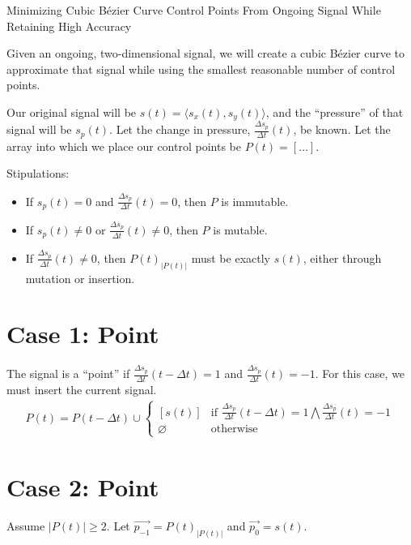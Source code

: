 \documentclass[12pt]{article}
\begin{document}
\begin{center}
    {\Large Minimizing Cubic B\'ezier Curve Control Points From Ongoing Signal While Retaining High Accuracy}
\end{center}

Given an ongoing, two-dimensional signal, we will create a cubic B\'ezier curve to approximate that signal while using the smallest reasonable number of control points.

Our original signal will be \(s(t) = \langle s_x(t),s_y(t) \rangle\), and the ``pressure'' of that signal will be \(s_p(t)\).
Let the change in pressure, \(\frac{\Delta s_p}{\Delta t}(t)\), be known. Let the array into which we place our control points be \(P(t) = [\dots]\).

Stipulations:
\begin{itemize}
    \item If \(s_p(t) = 0\) and \(\frac{\Delta s_p}{\Delta t}(t) = 0\), then \(P\) is immutable.
    \item If \(s_p(t) \ne 0\) or \(\frac{\Delta s_p}{\Delta t}(t) \ne 0\), then \(P\) is mutable.
    \item If \(\frac{\Delta s_p}{\Delta t}(t) \ne 0\), then \({P(t)}_{|P(t)|}\) must be exactly \(s(t)\), either through mutation or insertion.
\end{itemize}

\section*{Case 1: Point}

The signal is a ``point'' if \(\frac{\Delta s_p}{\Delta t}(t - \Delta t) = 1\) and \(\frac{\Delta s_p}{\Delta t}(t) = -1\).
For this case, we must insert the current signal.
\begin{align*}
    P(t) = P(t - \Delta t) \cup \begin{cases}
        \left[s(t)\right] & \text{if } \frac{\Delta s_p}{\Delta t}(t - \Delta t) = 1 \bigwedge \frac{\Delta s_p}{\Delta t}(t) = -1 \\
        \varnothing & \text{otherwise}
    \end{cases}
\end{align*}

\section*{Case 2: Point}

Assume \(|P(t)| \ge 2\).
Let \(\vec{p_{-1}} = {P(t)_{|P(t)|}}\) and \(\vec{p_0} = s(t)\).
\end{document}
